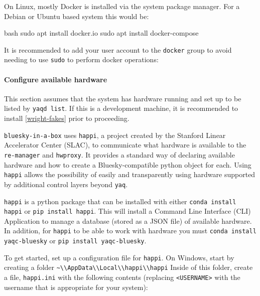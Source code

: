 On Linux, mostly Docker is installed via the system package manager.
For a Debian or Ubuntu based system this would be:

\begin{codefragment}{bash}
sudo apt install docker.io
sudo apt install docker-compose
\end{codefragment}

It is recommended to add your user account to the \texttt{docker} group to avoid needing to use \texttt{sudo} to perform docker operations:


\paragraph{Configure available \yaq hardware}

This section assumes that the system has \yaq hardware running and set up to be listed by \texttt{yaqd list}.
If this is a development machine, it is recommended to install \ref{wright-fakes} prior to proceeding.

\texttt{bluesky-in-a-box} uses \texttt{happi}\cite{}, a project created by the Stanford Linear Accelerator Center (SLAC), to communicate what hardware is available to the \texttt{re-manager} and \texttt{hwproxy}.
It provides a standard way of declaring available hardware and how to create a Bluesky-compatible python object for each.
Using \texttt{happi} allows the possibility of easily and transparently using hardware supported by additional control layers beyond \texttt{yaq}.

\texttt{happi} is a python package that can be installed with either \texttt{conda install happi} or \texttt{pip install happi}.
This will install a Command Line Interface (CLI) Application to manage a database (stored as a JSON file) of available hardware.
In addition, for \texttt{happi} to be able to work with \yaq hardware you must \texttt{conda install yaqc-bluesky} or \texttt{pip install yaqc-bluesky}.

To get started, set up a configuration file for \texttt{happi}.
On Windows, start by creating a folder \nolinkurl{~\\AppData\\Local\\happi\\happi}
Inside of this folder, create a file, \nolinkurl{happi.ini} with the following contents (replacing \texttt{<USERNAME>} with the username that is appropriate for your system):

